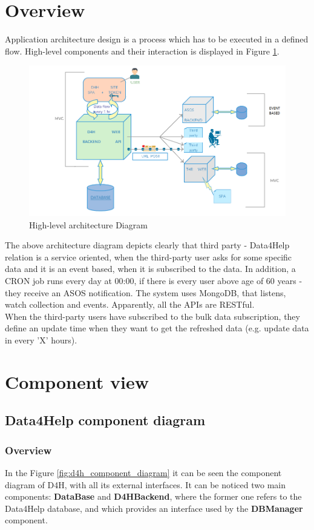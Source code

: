 \documentclass[a4paper, hidelinks, 12pt]{report}
\begin{document}
	\section{Overview}
	Application architecture design is a process which has to be executed in a defined flow. High-level components and their interaction is displayed in Figure \ref{fig:High-level architecture Diagram}.
	\begin{figure}[H]
		\centering
		\includegraphics[width=1\textwidth]{diagrams/architecture.png}
		\caption[High-level architecture Diagram]{High-level architecture Diagram}
		\label{fig:High-level architecture Diagram}
	\end{figure}
			
The above architecture diagram depicts clearly that third party - Data4Help relation is a service oriented, when the third-party user asks for some specific data and it is an event based, when it is subscribed to the data. In addition, a CRON job runs every day at 00:00, if there is every user above age of 60 years - they receive an ASOS notification. The system uses MongoDB, that listens, watch collection and events. Apparently, all the APIs are RESTful.\\
When the third-party users have subscribed to the bulk data subscription, they define an update time when they want to get the refreshed data (e.g. update data in every 'X' hours).

	\section{Component view}
		\subsection{Data4Help component diagram}
			\subsubsection{Overview}
		In the Figure \ref{fig:d4h_component_diagram} it can be seen the component diagram of D4H, with all its external interfaces. It can be noticed two main components: \textbf{DataBase} and \textbf{D4HBackend}, where the former one refers to the Data4Help database, and which provides an interface used by the \textbf{DBManager} component. \\
		
\end{document}

